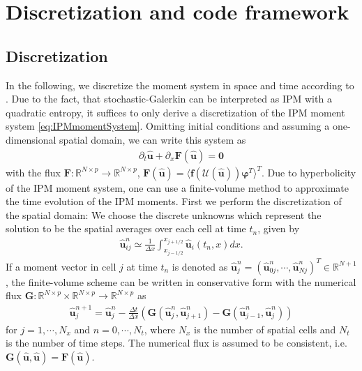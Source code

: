 \section{Discretization and code framework}
\label{sec:framework}
\subsection{Discretization}
In the following, we discretize the moment system in space and time according to \cite{kusch2017maximum}. Due to the fact, that stochastic-Galerkin can be interpreted as IPM with a quadratic entropy, it suffices to only derive a discretization of the IPM moment system \eqref{eq:IPMmomentSystem}.  
Omitting initial conditions and assuming a one-dimensional spatial domain, we can write this system  as
\begin{align*}
\partial_t \bm{\hat u}+\partial_x \bm{F}(\bm{\hat u}) = \bm{0}
\end{align*}
with the flux $\bm{F}:\mathbb{R}^{N\times p}\to\mathbb{R}^{N\times p}$, $\bm{F}(\bm{\hat u})=\langle \bm f(\mathcal{U}(\bm{\hat u}))\bm{\varphi}^T \rangle^T$. Due to hyperbolicity of the IPM moment system, one can use a finite-volume method to approximate the time evolution of the IPM moments. First we perform the discretization of the spatial domain: We choose the discrete unknowns which represent the solution to be the spatial averages over each cell at time $t_n$, given by
\begin{align*}
\bm{\hat u}_{ij}^n \simeq \frac{1}{\Delta x}\int_{x_{j-1/ 2}}^{x_{j+1/ 2}}\bm{\hat u}_i(t_n,x) dx.
\end{align*}
If a moment vector in cell $j$ at time $t_n$ is denoted as $\bm{\hat u}_j^n = (\bm{\hat u}_{0j}^n,\cdots,\bm{\hat u}_{Nj}^n)^T\in\mathbb{R}^{N+1}$, the finite-volume scheme can be written in conservative form with the numerical flux $\bm{G}:\mathbb{R}^{N\times p}\times\mathbb{R}^{N\times p}\to\mathbb{R}^{N\times p}$ as
\begin{align}\label{eq:IPMDiscretization}
\bm{\hat u}_{j}^{n+1} = \bm{\hat u}_{j}^{n}  - \frac{\Delta t}{\Delta x}\left( \bm{G}(\bm{\hat u}_{j}^{n},\bm{\hat u}_{j+1}^{n})- \bm{G}(\bm{\hat u}_{j-1}^{n},\bm{\hat u}_{j}^{n})\right)
\end{align}
for $j = 1,\cdots,N_x$ and $n = 0,\cdots,N_t$, where $N_x$ is the number of spatial cells and $N_t$ is the number of time steps.
The numerical flux is assumed to be consistent, i.e. $\bm{G}(\hat{\bm{u}},\hat{\bm{u}})=\bm{F}(\hat{\bm{u}})$.


